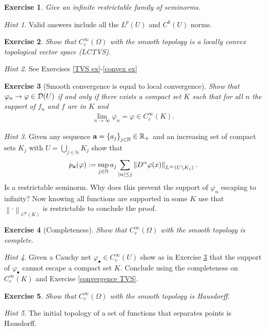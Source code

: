 \documentclass[12pt]{article}
\newtheorem{exercise}{Exercise}
\theoremstyle{remark}
\newtheorem*{hint}{Hint}
\renewcommand{\norm}[1]{\left\lVert #1 \right\rVert}\renewcommand{\abs}[1]{\left| #1 \right|}
\begin{document}
\begin{exercise}
	Give an infinite restrictable family of seminorms.
\end{exercise}
\begin{hint}
	Valid answers include all the $L^p(U)$ and $C^k(U)$ norms.
\end{hint}



\begin{exercise}
	Show that  $C_c^\infty(\Omega)$ with the smooth topology is a locally convex topological vector space (LCTVS).
\end{exercise}
\begin{hint}
	See Exercises \ref{TVS ex}-\ref{convex ex}
\end{hint}
\begin{exercise}[Smooth convergence is equal to local convergence]\label{local convergence}
	Show that $\varphi_n \to \varphi \in \mathcal{D}(U)$ if and only if
	there exists a compact set $K$ such that for all $n$ the support of $f_n$ and $f$ are in  $K$ and
	\begin{align*}
		\lim_{n \to \infty}\varphi_n  =\varphi \in  C_c^\infty(K).
	\end{align*}

\end{exercise}
\begin{hint}
	Given any sequence $\mathbf{a}=\left\{a_j\right\}_{j\in \mathbb{N}} \in \mathbb{R}_+$ and an increasing set of compact sets $K_j$ with $U=\bigcup_{j\in \mathbb{N}} K_j$ show that
	\begin{align*}
		p_{\mathbf{a}}(\varphi):=\sup _{j \in \N}{a_j} \sum_{|\alpha| \leq j}\norm{D^\alpha \varphi(x)}_{L^\infty(U\setminus K_j)}.
	\end{align*}
	Is a restrictable seminorm. Why does this prevent the support of $\varphi_n$ escaping to infinity? Now knowing all functions are supported in some $K$ use that $\norm{\cdot }_{C^k(K)}$ is restrictable to conclude the proof.
\end{hint}
\begin{exercise}[Completeness]
	Show that $C_c^\infty(\Omega)$ with the smooth topology is complete.
\end{exercise}
\begin{hint}
	Given a Cauchy net $\varphi_{\bullet} \in C_c^\infty(U)$ show as in Exercise \ref{local convergence} that the support of  $\varphi_{\bullet}$ cannot escape a compact set $K$. Conclude using the completeness on  $C_c^\infty(K)$ and Exercise \ref{convergence TVS}.
\end{hint}
\begin{exercise}
	Show that $C_c^\infty(\Omega)$ with the smooth topology is Hausdorff.
\end{exercise}
\begin{hint}
	The initial topology of a set of functions that separates points is Hausdorff.
\end{hint}
\end{document}
